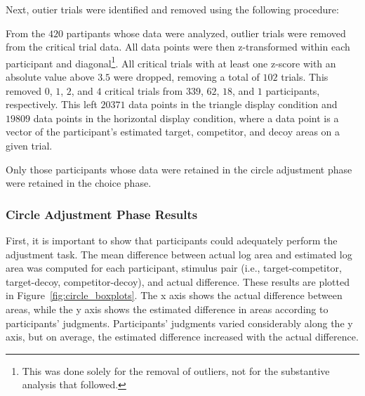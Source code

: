 Next, outier trials were identified and removed using the following procedure:

From the $420$ partipants whose data were analyzed, outlier trials were removed from the critical trial data. All data points were then z-transformed within each participant and diagonal\footnote{This was done solely for the removal of outliers, not for the substantive analysis that followed.}. All critical trials with at least one z-score with an absolute value above $3.5$ were dropped, removing a total of $102$ trials. This removed $0$, $1$, $2$, and $4$ critical trials from $339$, $62$, $18$, and $1$ participants, respectively. This left $20371$ data points in the triangle display condition and $19809$ data points in the horizontal display condition, where a data point is a vector of the participant's estimated target, competitor, and decoy areas on a given trial. 

Only those participants whose data were retained in the circle adjustment phase were retained in the choice phase. 

\subsubsection{Circle Adjustment Phase Results}

First, it is important to show that participants could adequately perform the adjustment task. The mean difference between actual log area and estimated log area was computed for each participant, stimulus pair (i.e., target-competitor, target-decoy, competitor-decoy), and actual difference. These results are plotted in Figure~\ref{fig:circle_boxplots}. The x axis shows the actual difference between areas, while the y axis shows the estimated difference in areas according to participants' judgments. Participants' judgments varied considerably along the y axis, but on average, the estimated difference increased with the actual difference. 

